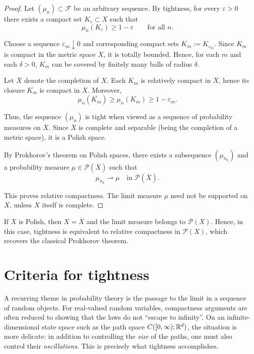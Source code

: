 \begin{proof}
Let $(\mu_n)\subset\mathcal{F}$ be an arbitrary sequence.
By tightness, for every $\varepsilon>0$ there exists a compact set $K_\varepsilon\subset X$ such that
\[
\mu_n(K_\varepsilon)\ge 1-\varepsilon
\qquad\text{for all } n.
\]

Choose a sequence $\varepsilon_m\downarrow 0$ and corresponding compact sets $K_m:=K_{\varepsilon_m}$.
Since $K_m$ is compact in the metric space $X$, it is totally bounded.
Hence, for each $m$ and each $\delta>0$, $K_m$ can be covered by finitely many balls of radius $\delta$.

Let $\overline{X}$ denote the completion of $X$.
Each $K_m$ is relatively compact in $\overline{X}$, hence its closure $\overline{K_m}$ is compact in $\overline{X}$.
Moreover,
\[
\mu_n(\overline{K_m}) \ge \mu_n(K_m) \ge 1-\varepsilon_m.
\]

Thus, the sequence $(\mu_n)$ is tight when viewed as a sequence of probability measures on $\overline{X}$.
Since $\overline{X}$ is complete and separable (being the completion of a metric space),
it is a Polish space.

By Prokhorov's theorem on Polish spaces, there exists a subsequence $(\mu_{n_k})$ and a probability measure
$\mu\in\mathcal{P}(\overline{X})$ such that
\[
\mu_{n_k} \rightharpoonup \mu \quad \text{in } \mathcal{P}(\overline{X}).
\]

This proves relative compactness.  
The limit measure $\mu$ need not be supported on $X$, unless $X$ itself is complete.
\end{proof}

\begin{remark}
If $X$ is Polish, then $X=\overline{X}$ and the limit measure belongs to $\mathcal{P}(X)$.
Hence, in this case, tightness is equivalent to relative compactness in $\mathcal{P}(X)$,
which recovers the classical Prokhorov theorem.
\end{remark}


\section{Criteria for tightness}\label{sec:tight-criteria}
A recurring theme in probability theory is the passage to the limit in a sequence of random objects.
For real-valued random variables, compactness arguments are often reduced to showing that the laws do not
``escape to infinity''.  On an infinite-dimensional state space such as the path space
$C([0,\infty);\mathbb{R}^d)$, the situation is more delicate: in addition to controlling the \emph{size} of the paths,
one must also control their \emph{oscillations}.  This is precisely what tightness accomplishes.

